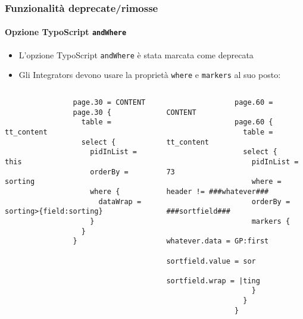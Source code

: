 \begin{frame}[fragile]
	\frametitle{Funzionalità deprecate/rimosse}
	\framesubtitle{Opzione TypoScript \texttt{andWhere}}

	\lstset{basicstyle=\tiny\ttfamily}

	\begin{itemize}
		\item L'opzione TypoScript \texttt{andWhere} è stata marcata come deprecata
		\item Gli Integrators devono usare la proprietà \texttt{where} e \texttt{markers} al suo posto:
	\end{itemize}

	\begin{columns}[T]
		\begin{column}{.6\textwidth}

			\lstset{xleftmargin=1cm}

			\begin{lstlisting}
				page.30 = CONTENT
				page.30 {
				  table = tt_content
				  select {
				    pidInList = this
				    orderBy = sorting
				    where {
				      dataWrap = sorting>{field:sorting}
				    }
				  }
				}
			\end{lstlisting}
		\end{column}
		\begin{column}{.4\textwidth}
			\begin{lstlisting}
				page.60 = CONTENT
				page.60 {
				  table = tt_content
				  select {
				    pidInList = 73
				    where = header != ###whatever###
				    orderBy = ###sortfield###
				    markers {
				      whatever.data = GP:first
				      sortfield.value = sor
				      sortfield.wrap = |ting
				    }
				  }
				}
			\end{lstlisting}
		\end{column}
	\end{columns}

\end{frame}


